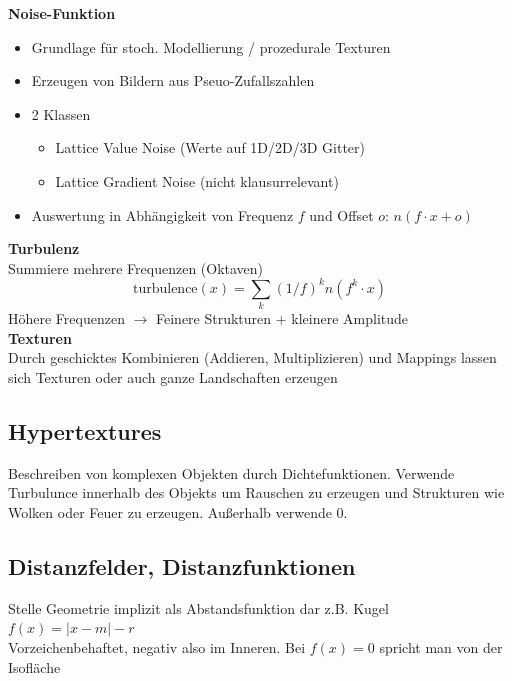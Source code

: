 \documentclass[10pt,a4paper]{article}
\begin{document}
        \textbf{Noise-Funktion}
        \begin{itemize}
        	\item Grundlage für stoch. Modellierung / prozedurale Texturen
        	\item Erzeugen von Bildern aus Pseuo-Zufallszahlen
        	\item 2 Klassen
		        \begin{itemize}
		          \item Lattice Value Noise (Werte auf 1D/2D/3D Gitter)
		          \item Lattice Gradient Noise (nicht klausurrelevant)
		        \end{itemize}
		    \item Auswertung in Abhängigkeit von Frequenz $f$ und Offset $o$: $n(f \cdot x + o)$
        \end{itemize}

        \textbf{Turbulenz}\\
        Summiere mehrere Frequenzen (Oktaven)\\
        $$\text{turbulence}(x) = \sum_k (1 / f)^k n(f^k \cdot x)$$
        Höhere Frequenzen $\rightarrow$ Feinere Strukturen + kleinere Amplitude\\

        \textbf{Texturen}\\
        Durch geschicktes Kombinieren (Addieren, Multiplizieren) und Mappings lassen sich Texturen oder auch
        ganze Landschaften erzeugen
        
        \subsection{Hypertextures}
        \label{pm:sub:hypertextures}
        
        Beschreiben von komplexen Objekten durch Dichtefunktionen. Verwende Turbulunce innerhalb des Objekts
        um Rauschen zu erzeugen und Strukturen wie Wolken oder Feuer zu erzeugen. Außerhalb verwende 0.
        
        \subsection{Distanzfelder, Distanzfunktionen}
        \label{pm:sub:distanzfelder_distanzfunktionen}
        
        Stelle Geometrie implizit als Abstandsfunktion dar z.B. Kugel $f(x) = | x - m | - r$\\
        Vorzeichenbehaftet, negativ also im Inneren. Bei $f(x) = 0$ spricht man von der Isofläche\\
\end{document}
